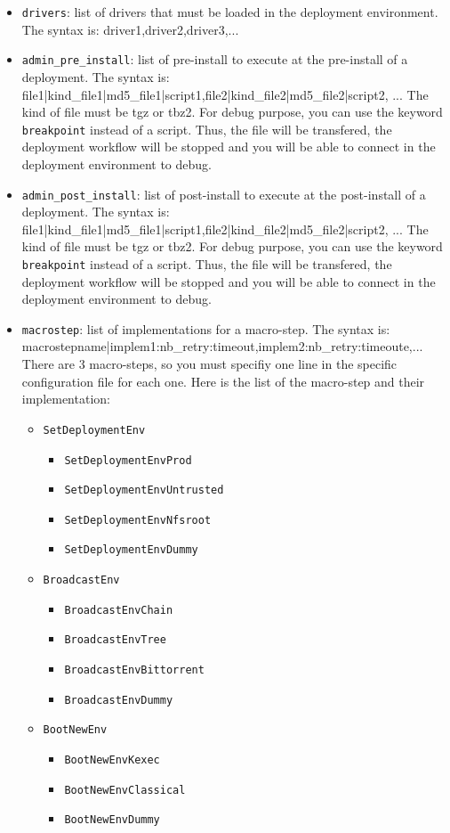 \documentclass[a4wide,10pt,oneside]{book}
\begin{document}
\begin{itemize}
\item \texttt{drivers}: list of drivers that must be loaded in the deployment environment. The syntax is: driver1,driver2,driver3,...
\item \texttt{admin\_pre\_install}: list of pre-install to execute at the pre-install of a deployment. The syntax is: file1|kind\_file1|md5\_file1|script1,file2|kind\_file2|md5\_file2|script2, ... The kind of file must be tgz or tbz2. For debug purpose, you can use the keyword \texttt{breakpoint} instead of a script. Thus, the file will be transfered, the deployment workflow will be stopped and you will be able to connect in the deployment environment to debug.
\item \texttt{admin\_post\_install}: list of post-install to execute at the post-install of a deployment. The syntax is: file1|kind\_file1|md5\_file1|script1,file2|kind\_file2|md5\_file2|script2, ... The kind of file must be tgz or tbz2. For debug purpose, you can use the keyword \texttt{breakpoint} instead of a script. Thus, the file will be transfered, the deployment workflow will be stopped and you will be able to connect in the deployment environment to debug.
\item \texttt{macrostep}: list of implementations for a macro-step. The syntax is: macrostepname|implem1:nb\_retry:timeout,implem2:nb\_retry:timeoute,... There are 3 macro-steps, so you must specifiy one line in the specific configuration file for each one. Here is the list of the macro-step and their implementation:
  \begin{itemize}
  \item \texttt{SetDeploymentEnv}
    \begin{itemize}
    \item \texttt{SetDeploymentEnvProd}
    \item \texttt{SetDeploymentEnvUntrusted}
    \item \texttt{SetDeploymentEnvNfsroot}
    \item \texttt{SetDeploymentEnvDummy}
    \end{itemize}
  \item \texttt{BroadcastEnv}
    \begin{itemize}
      \item \texttt{BroadcastEnvChain}
      \item \texttt{BroadcastEnvTree}
      \item \texttt{BroadcastEnvBittorrent}
      \item \texttt{BroadcastEnvDummy}
    \end{itemize}
  \item \texttt{BootNewEnv}
    \begin{itemize}
      \item \texttt{BootNewEnvKexec}
      \item \texttt{BootNewEnvClassical}
      \item \texttt{BootNewEnvDummy}
    \end{itemize}
  \end{itemize}
\end{itemize}
\end{document}
